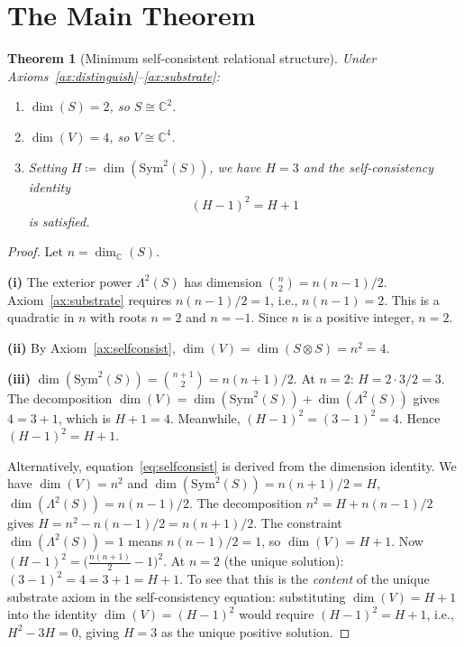 \documentclass[11pt,a4paper]{article}
\newtheorem{theorem}{Theorem}[section]
\theoremstyle{definition}
\theoremstyle{remark}
\newcommand{\C}{\mathbb{C}}
\newcommand{\Sym}{\mathrm{Sym}}
\begin{document}
\section{The Main Theorem}\label{sec:main}

\begin{theorem}[Minimum self-consistent relational structure]\label{thm:main}
Under Axioms~\ref{ax:distinguish}--\ref{ax:substrate}:
\begin{enumerate}[label=(\roman*)]
\item $\dim(S)=2$, so $S\cong\C^2$.
\item $\dim(V)=4$, so $V\cong\C^4$.
\item Setting $H\coloneqq\dim(\Sym^2(S))$, we have $H=3$ and the
self-consistency identity
\begin{equation}\label{eq:selfconsist}
(H-1)^2 = H+1
\end{equation}
is satisfied.
\end{enumerate}
\end{theorem}

\begin{proof}
Let $n=\dim_\C(S)$.

\medskip\noindent\textbf{(i)} The exterior power $\Lambda^2(S)$ has dimension
$\binom{n}{2}=n(n-1)/2$.
Axiom~\ref{ax:substrate} requires $n(n-1)/2=1$, i.e., $n(n-1)=2$.
This is a quadratic in $n$ with roots $n=2$ and $n=-1$.
Since $n$ is a positive integer, $n=2$.

\medskip\noindent\textbf{(ii)} By Axiom~\ref{ax:selfconsist},
$\dim(V)=\dim(S\otimes S)=n^2=4$.

\medskip\noindent\textbf{(iii)} $\dim(\Sym^2(S))=\binom{n+1}{2}=n(n+1)/2$.
At $n=2$: $H=2\cdot 3/2=3$.
The decomposition $\dim(V)=\dim(\Sym^2(S))+\dim(\Lambda^2(S))$ gives
$4=3+1$, which is $H+1=4$.
Meanwhile, $(H-1)^2=(3-1)^2=4$.
Hence $(H-1)^2=H+1$.

\medskip\noindent
Alternatively, equation~\eqref{eq:selfconsist} is derived from the
dimension identity. We have $\dim(V)=n^2$ and
$\dim(\Sym^2(S))=n(n+1)/2=H$, $\dim(\Lambda^2(S))=n(n-1)/2$.
The decomposition $n^2=H+n(n-1)/2$ gives
$H=n^2-n(n-1)/2=n(n+1)/2$.
The constraint $\dim(\Lambda^2(S))=1$ means $n(n-1)/2=1$, so
$\dim(V)=H+1$.
Now $(H-1)^2=\bigl(\tfrac{n(n+1)}{2}-1\bigr)^2$.
At $n=2$ (the unique solution): $(3-1)^2=4=3+1=H+1$.
To see that this is the \emph{content} of the unique substrate axiom in
the self-consistency equation: substituting $\dim(V)=H+1$ into the
identity $\dim(V)=(H-1)^2$ would require $(H-1)^2=H+1$, i.e.,
$H^2-3H=0$, giving $H=3$ as the unique positive solution.
\end{proof}
\end{document}
